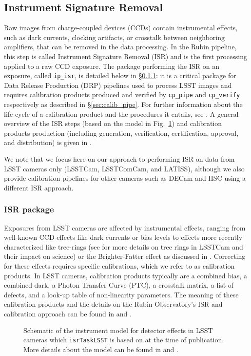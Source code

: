 \subsection{Instrument Signature Removal}
\label{sec:isr}

Raw images from charge-coupled devices (CCDs) contain instrumental effects, such as dark currents, clocking artifacts, or crosstalk between neighboring amplifiers, that can be removed in the data processing.
In the Rubin pipeline, this step is called Instrument Signature Removal (ISR) and is the first processing applied to a raw CCD exposure.
The package performing the ISR on an exposure, called \texttt{ip\_isr}, is detailed below in \S\ref{sec:ip_isr}: it is a critical package for Data Release Production (DRP) pipelines used to process LSST images and requires calibration products produced and verified by \texttt{cp\_pipe} and \texttt{cp\_verify} respectively as described in \S\ref{sec:calib_pipe}.
For further information about the life cycle of a calibration product and the procedures it entails, see \citet{DMTN-222}.
A general overview of the ISR steps (based on the model in Fig.~\ref{fig:isr_model}) and calibration products production (including generation, verification, certification, approval, and distribution) is given in \citet{2025JATIS..11a1209P}.

We note that we focus here on our approach to performing ISR on data from LSST cameras only (LSSTCam, LSSTComCam, and LATISS), although we also provide calibration pipelines for other cameras such as DECam and HSC using a different ISR approach.

\subsubsection{ISR package}
\label{sec:ip_isr}

Exposures from LSST cameras are affected by instrumental effects, ranging from well-known CCD effects like dark currents or bias levels to effects more recently characterized like tree-rings (see \citet{2017JInst..12C5015P,2020JATIS...6a1005P,2023PASP..135k5003E,2015JInst..10C8010O,2016ApJ...825...61O} for more details on tree rings in LSSTCam and their impact on science) or the Brighter-Fatter effect as discussed in \citet{2024PASP..136d5003B}.
Correcting for these effects requires specific calibrations, which we refer to as calibration products.
In LSST cameras, calibration products typically are a combined bias, a combined dark, a Photon Transfer Curve (PTC), a crosstalk matrix, a list of defects, and a look-up table of non-linearity parameters.
The meaning of these calibration products and the details on the Rubin Observatory's ISR and calibration approach can be found in \citet{2025JATIS..11a1209P} and \citet{SITCOMTN-086}.
\begin{figure}
    \caption{Schematic of the instrument model for detector effects in LSST cameras which \texttt{isrTaskLSST} is based on at the time of publication.
    More details about the model can be found in \citet{SITCOMTN-086} and \citet{ 2025JATIS..11a1209P}.}
    \label{fig:isr_model}
\end{figure}

